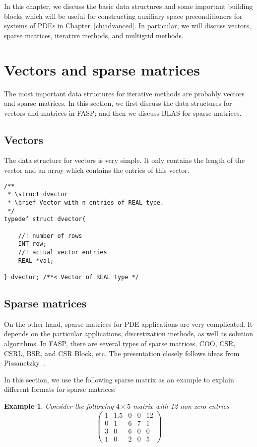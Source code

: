 \documentclass[11pt]{memoir}
\newtheorem{example}[theorem]{Example}
\begin{document}
In this chapter, we discuss the basic data structures and some important building blocks which will be useful for constructing auxiliary space preconditioners for systems of PDEs in Chapter~\ref{ch:advanced}. In particular, we will discuss vectors, sparse matrices, iterative methods, and multigrid methods.

\section{Vectors and sparse matrices}\label{sec:blas}

The most important data structures for iterative methods are probably vectors and sparse matrices. In this section, we first discuss the data structures for vectors and matrices in FASP; and then we discuss BLAS for sparse matrices.

\subsection{Vectors}

The data structure for vectors is very simple. It only contains the length of the vector and an array which contains the entries of this vector.

\begin{lstlisting}
/**
 * \struct dvector
 * \brief Vector with n entries of REAL type.
 */
typedef struct dvector{
	
    //! number of rows
	INT row;
    //! actual vector entries
	REAL *val;
	
} dvector; /**< Vector of REAL type */
\end{lstlisting}

\subsection{Sparse matrices}

On the other hand, sparse matrices for PDE applications are very complicated. It depends on the particular applications, discretization methods, as well as solution algorithms. In FASP, there are several types of sparse matrices, COO, CSR, CSRL, BSR, and CSR Block, etc. The presentation closely follows ideas from Pissanetzky~\cite{Pissanetzky.Pissanetzky.1984hc}.

In this section, we use the following sparse matrix as an example to explain different formats for sparse matrices:
%
\begin{example}\label{ex:sparse}
Consider the following $4\times 5$ matrix with 12 non-zero entries
$$
\left(\begin{array}{ccccc}
1 & 1.5 & 0 & 0 & 12\\
0 & 1    & 6 & 7 & 1\\
3 & 0    & 6 & 0 & 0\\
1 & 0    & 2 & 0 & 5
\end{array}
\right)
$$
\end{example}
\end{document}
